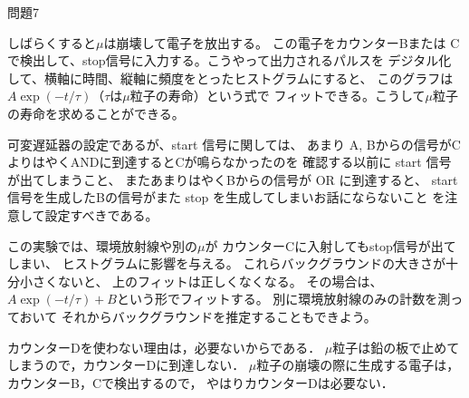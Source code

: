\documentclass[fleqn]{jbook}
\begin{document}
\begin{answer}{問題7}{}
\begin{enumerate}
\begin{enumerate}
しばらくすると$\mu$は崩壊して電子を放出する。
この電子をカウンターBまたは
Cで検出して、stop信号に入力する。こうやって出力されるパルスを
デジタル化して、横軸に時間、縦軸に頻度をとったヒストグラムにすると、
このグラフは$A\exp(-t/\tau)$（$\tau$は$\mu$粒子の寿命）という式で
フィットできる。こうして$\mu$粒子の寿命を求めることができる。

可変遅延器の設定であるが、start 信号に関しては、
あまり A, Bからの信号がCよりはやくANDに到達するとCが鳴らなかったのを
確認する以前に start 信号が出てしまうこと、
またあまりはやくBからの信号が OR に到達すると、
start 信号を生成したBの信号がまた stop を生成してしまいお話にならないこと
を注意して設定すべきである。

この実験では、環境放射線や別の$\mu$が
カウンターCに入射してもstop信号が出てしまい、
ヒストグラムに影響を与える。
これらバックグラウンドの大きさが十分小さくないと、
上のフィットは正しくなくなる。
その場合は、$A\exp(-t/\tau)+B$という形でフィットする。
別に環境放射線のみの計数を測っておいて
それからバックグラウンドを推定することもできよう。

カウンターDを使わない理由は，必要ないからである．
$\mu$粒子は鉛の板で止めてしまうので，カウンターDに到達しない．
$\mu$粒子の崩壊の際に生成する電子は，カウンターB，Cで検出するので，
やはりカウンターDは必要ない．
\end{enumerate}\end{enumerate}
\begin{center}\end{center}
\end{answer}
\end{document}
